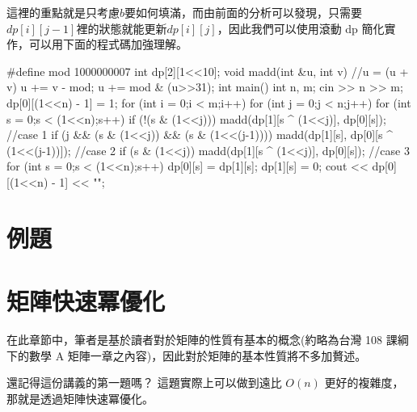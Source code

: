 \documentclass[main.tex]{subfiles}
\begin{document}
        \par 這裡的重點就是只考慮$b$要如何填滿，而由前面的分析可以發現，只需要$dp[i][j-1]$裡的狀態就能更新$dp[i][j]$，因此我們可以使用滾動 dp 簡化實作，可以用下面的程式碼加強理解。
        \begin{C++}
        #define mod 1000000007
        int dp[2][1<<10];
        void madd(int &u, int v) { //u = (u + v) %
            u += v - mod; u += mod & (u>>31);
        }
        int main() {
            int n, m;
            cin >> n >> m;
            dp[0][(1<<n) - 1] = 1;
            for (int i = 0;i < m;i++) {
                for (int j = 0;j < n;j++) {
                    for (int s = 0;s < (1<<n);s++) {
                        if (!(s & (1<<j))) madd(dp[1][s ^ (1<<j)], dp[0][s]); //case 1
                        if (j && (s & (1<<j)) && (s & (1<<(j-1)))) {
                            madd(dp[1][s], dp[0][s ^ (1<<(j-1))]);
                        } //case 2
                        if (s & (1<<j)) madd(dp[1][s ^ (1<<j)], dp[0][s]); //case 3
                    }
                    for (int s = 0;s < (1<<n);s++) {
                        dp[0][s] = dp[1][s];
                        dp[1][s] = 0;
                    }
                }
            }
            cout << dp[0][(1<<n) - 1] << "\n";
        }
        \end{C++}
        \section{例題}


\section{矩陣快速冪優化}
    在此章節中，筆者是基於讀者對於矩陣的性質有基本的概念(約略為台灣 108 課綱下的數學 A 矩陣一章之內容)，因此對於矩陣的基本性質將不多加贅述。

    還記得這份講義的第一題嗎？
    這題實際上可以做到遠比 $O(n)$ 更好的複雜度，那就是透過矩陣快速冪優化。
    
\end{document}
